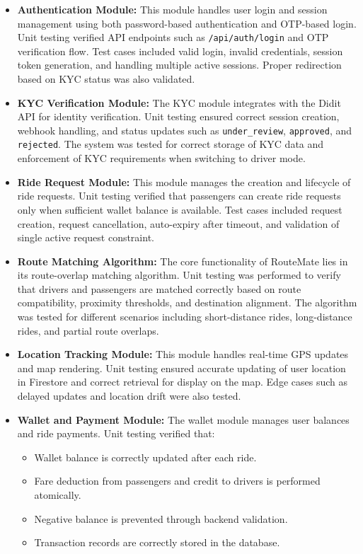 \documentclass[10pt,a4paper]{report}
\begin{document}
\begin{itemize}

\item \textbf{Authentication Module:}
This module handles user login and session management using both password-based authentication and OTP-based login. Unit testing verified API endpoints such as \texttt{/api/auth/login} and OTP verification flow. Test cases included valid login, invalid credentials, session token generation, and handling multiple active sessions. Proper redirection based on KYC status was also validated.

\item \textbf{KYC Verification Module:}
The KYC module integrates with the Didit API for identity verification. Unit testing ensured correct session creation, webhook handling, and status updates such as \texttt{under\_review}, \texttt{approved}, and \texttt{rejected}. The system was tested for correct storage of KYC data and enforcement of KYC requirements when switching to driver mode.

\item \textbf{Ride Request Module:}
This module manages the creation and lifecycle of ride requests. Unit testing verified that passengers can create ride requests only when sufficient wallet balance is available. Test cases included request creation, request cancellation, auto-expiry after timeout, and validation of single active request constraint.

\item \textbf{Route Matching Algorithm:}
The core functionality of RouteMate lies in its route-overlap matching algorithm. Unit testing was performed to verify that drivers and passengers are matched correctly based on route compatibility, proximity thresholds, and destination alignment. The algorithm was tested for different scenarios including short-distance rides, long-distance rides, and partial route overlaps.

\item \textbf{Location Tracking Module:}
This module handles real-time GPS updates and map rendering. Unit testing ensured accurate updating of user location in Firestore and correct retrieval for display on the map. Edge cases such as delayed updates and location drift were also tested.

\item \textbf{Wallet and Payment Module:}
The wallet module manages user balances and ride payments. Unit testing verified that:
\begin{itemize}
\item Wallet balance is correctly updated after each ride.
\item Fare deduction from passengers and credit to drivers is performed atomically.
\item Negative balance is prevented through backend validation.
\item Transaction records are correctly stored in the database.
\end{itemize}


\end{itemize}
\end{document}
